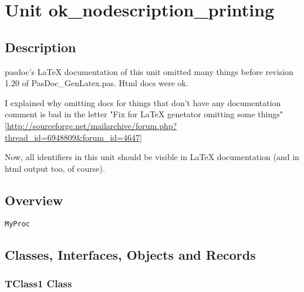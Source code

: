 \documentclass{report}
\newif\ifpdf
\begin{document}
\chapter{Unit ok{\_}nodescription{\_}printing}
\label{ok_nodescription_printing}
\section{Description}
pasdoc's LaTeX documentation of this unit omitted many things before revision 1.20 of PasDoc{\_}GenLatex.pas. Html docs were ok.

I explained why omitting docs for things that don't have any documentation comment is bad in the letter "Fix for LaTeX genetator omitting some things" [\href{http://sourceforge.net/mailarchive/forum.php?thread_id=6948809&forum_id=4647}{http://sourceforge.net/mailarchive/forum.php?thread{\_}id=6948809{\&}forum{\_}id=4647}]

Now, all identifiers in this unit should be visible in LaTeX documentation (and in html output too, of course).
\section{Overview}
\begin{description}
\item[\texttt{\begin{ttfamily}TClass1\end{ttfamily} Class}]
\item[\texttt{\begin{ttfamily}TMyRecord\end{ttfamily} Record}]
\item[\texttt{\begin{ttfamily}TMyRecord2\end{ttfamily} Record}]
\item[\texttt{\begin{ttfamily}TMyRecord3\end{ttfamily} Record}]
\end{description}
\begin{description}
\item[\texttt{MyProc}]
\end{description}
\section{Classes, Interfaces, Objects and Records}
\ifpdf
\subsection*{\large{\textbf{TClass1 Class}}\normalsize\hspace{1ex}\hrulefill}
\else
\end{document}
